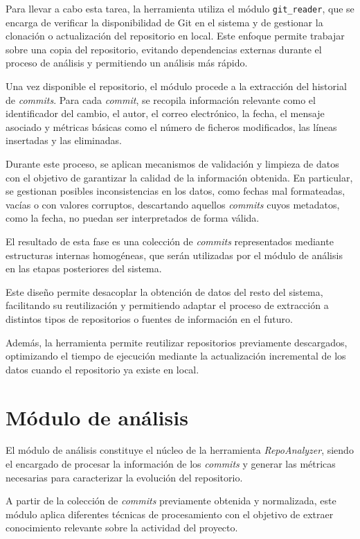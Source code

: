 \documentclass[a4paper, 12pt]{book}
\begin{document}
Para llevar a cabo esta tarea, la herramienta utiliza el módulo \texttt{git\_reader}, que se encarga de verificar la disponibilidad de Git en el sistema y de gestionar la clonación o actualización del repositorio en local. Este enfoque permite trabajar sobre una copia del repositorio, evitando dependencias externas durante el proceso de análisis y permitiendo un análisis más rápido.

Una vez disponible el repositorio, el módulo procede a la extracción del historial de \emph{commits}. Para cada \emph{commit}, se recopila información relevante como el identificador del cambio, el autor, el correo electrónico, la fecha, el mensaje asociado y métricas básicas como el número de ficheros modificados, las líneas insertadas y las eliminadas.

Durante este proceso, se aplican mecanismos de validación y limpieza de datos con el objetivo de garantizar la calidad de la información obtenida. En particular, se gestionan posibles inconsistencias en los datos, como fechas mal formateadas, vacías o con valores corruptos, descartando aquellos \emph{commits} cuyos metadatos, como la fecha, no puedan ser interpretados de forma válida.

El resultado de esta fase es una colección de \emph{commits} representados mediante estructuras internas homogéneas, que serán utilizadas por el módulo de análisis en las etapas posteriores del sistema.

Este diseño permite desacoplar la obtención de datos del resto del sistema, facilitando su reutilización y permitiendo adaptar el proceso de extracción a distintos tipos de repositorios o fuentes de información en el futuro.

Además, la herramienta permite reutilizar repositorios previamente descargados, optimizando el tiempo de ejecución mediante la actualización incremental de los datos cuando el repositorio ya existe en local.

\section{Módulo de análisis}
\label{sec:analisis}

El módulo de análisis constituye el núcleo de la herramienta \emph{RepoAnalyzer}, siendo el encargado de procesar la información de los \emph{commits} y generar las métricas necesarias para caracterizar la evolución del repositorio.

A partir de la colección de \emph{commits} previamente obtenida y normalizada, este módulo aplica diferentes técnicas de procesamiento con el objetivo de extraer conocimiento relevante sobre la actividad del proyecto.
\end{document}
